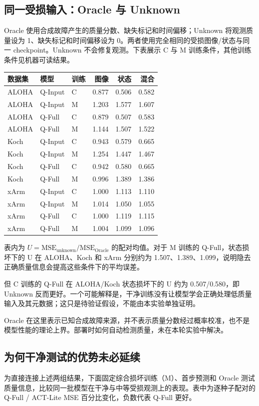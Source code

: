 \documentclass[11pt,a4paper,fontset=fandol]{ctexart}
\newcommand{\note}[1]{\begin{tcolorbox}[colback=panel,colframe=rule,boxrule=0.5pt,arc=1mm]#1\end{tcolorbox}}
\begin{document}
\subsection{同一受损输入：Oracle 与 Unknown}
Oracle 使用合成故障产生的质量分数、缺失标记和时间偏移；Unknown 将观测质量设为 1、缺失标记和时间偏移设为 0。两者使用完全相同的受损图像/状态与同一 checkpoint。Unknown 不会修复观测。下表展示 C 与 M 训练条件，其他训练条件见机器可读结果。

\begin{center}
\small
\begin{tabular}{lllrrr}
\toprule
数据集 & 模型 & 训练 & 图像 & 状态 & 混合 \\
\midrule
ALOHA & Q-Input & C & 0.877 & 0.506 & 0.582 \\
ALOHA & Q-Input & M & 1.203 & 1.577 & 1.607 \\
ALOHA & Q-Full & C & 0.879 & 0.507 & 0.583 \\
ALOHA & Q-Full & M & 1.144 & 1.507 & 1.522 \\
Koch & Q-Input & C & 0.943 & 0.579 & 0.665 \\
Koch & Q-Input & M & 1.254 & 1.447 & 1.467 \\
Koch & Q-Full & C & 0.942 & 0.580 & 0.665 \\
Koch & Q-Full & M & 0.996 & 1.389 & 1.386 \\
xArm & Q-Input & C & 1.000 & 1.113 & 1.110 \\
xArm & Q-Input & M & 1.014 & 1.050 & 1.055 \\
xArm & Q-Full & C & 1.000 & 1.119 & 1.115 \\
xArm & Q-Full & M & 1.004 & 1.099 & 1.096 \\
\bottomrule
\end{tabular}
\end{center}
表内为 $U=\mathrm{MSE}_{\mathrm{unknown}}/\mathrm{MSE}_{\mathrm{Oracle}}$ 的配对均值。对于 M 训练的 Q-Full，状态损坏下的 U 在 ALOHA、Koch 和 xArm 分别约为 1.507、1.389、1.099，说明隐去正确质量信息会提高这些条件下的平均误差。

但 C 训练的 Q-Full 在 ALOHA/Koch 状态损坏下的 U 约为 0.507/0.580，即 Unknown 反而更好。一个可能解释是，干净训练没有让模型学会正确处理低质量输入及其元数据；这只是待验证假设，不能由本实验单独证明。

\note{Oracle 在这里表示已知合成故障来源，并不表示质量分数经过概率校准，也不是模型性能的理论上界。部署时如何自动检测质量，未在本轮实验中解决。}
\clearpage\subsection{为何干净测试的优势未必延续}
为直接连接上述两组结果，下面固定综合损坏训练（M）、首步预测和 Oracle 测试质量信息，比较同一批模型在干净与中等受损观测上的表现。表中为逐种子配对的 Q-Full / ACT-Lite MSE 百分比变化，负数代表 Q-Full 更好。
\end{document}

